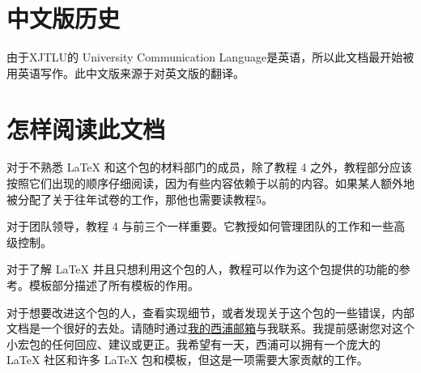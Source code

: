 \section{中文版历史}
由于XJTLU的 University Communication Language是英语，所以此文档最开始被用英语写作。此中文版来源于对英文版的翻译。

\section{怎样阅读此文档}
对于不熟悉 \LaTeX{} 和这个包的材料部门的成员，除了教程 4 之外，教程部分应该按照它们出现的顺序仔细阅读，因为有些内容依赖于以前的内容。如果某人额外地被分配了关于往年试卷的工作，那他也需要读教程5。

对于团队领导，教程 4 与前三个一样重要。它教授如何管理团队的工作和一些高级控制。

对于了解 \LaTeX{} 并且只想利用这个包的人，教程可以作为这个包提供的功能的参考。模板部分描述了所有模板的作用。

对于想要改进这个包的人，查看实现细节，或者发现关于这个包的一些错误，内部文档是一个很好的去处。请随时通过\href{mailto:guanyuming.he20@student.xjtlu.edu.cn}{我的西浦邮箱}与我联系。我提前感谢您对这个小宏包的任何回应、建议或更正。我希望有一天，西浦可以拥有一个庞大的 \LaTeX{} 社区和许多 \LaTeX{} 包和模板，但这是一项需要大家贡献的工作。